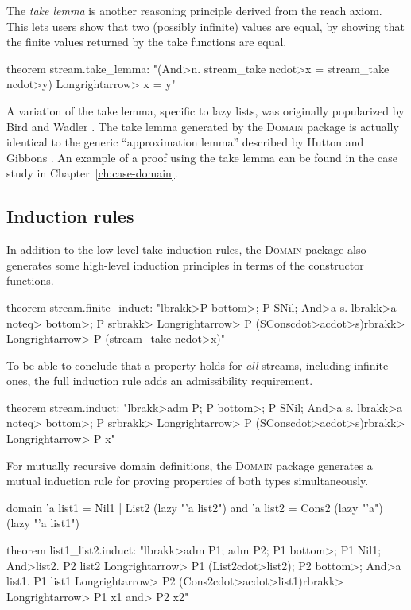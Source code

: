 The \emph{take lemma} is another reasoning principle derived from the reach axiom. This lets users show that two (possibly infinite) values are equal, by showing that the finite values returned by the take functions are equal.
%
\begin{isacode}
theorem stream.take_lemma:
  "(\<And>n. stream_take n\<cdot>x = stream_take n\<cdot>y) \<Longrightarrow> x = y"
\end{isacode}
%
A variation of the take lemma, specific to lazy lists, was originally popularized by Bird and Wadler \cite{BirdWadler1988}. The take lemma generated by the \textsc{Domain} package is actually identical to the generic ``approximation lemma'' described by Hutton and Gibbons \cite{Hutton01}. An example of a proof using the take lemma can be found in the case study in Chapter~\ref{ch:case-domain}.

\subsection{Induction rules}

In addition to the low-level take induction rules, the \textsc{Domain} package also generates some high-level induction principles in terms of the constructor functions.

\begin{isacode}
theorem stream.finite_induct:
  "\<lbrakk>P \<bottom>; P SNil; \<And>a s. \<lbrakk>a \<noteq> \<bottom>; P s\<rbrakk> \<Longrightarrow> P (SCons\<cdot>a\<cdot>s)\<rbrakk>
    \<Longrightarrow> P (stream_take n\<cdot>x)"
\end{isacode}
%
To be able to conclude that a property holds for \emph{all} streams, including infinite ones, the full induction rule adds an admissibility requirement.
%
\begin{isacode}
theorem stream.induct:
  "\<lbrakk>adm P; P \<bottom>; P SNil; \<And>a s. \<lbrakk>a \<noteq> \<bottom>; P s\<rbrakk> \<Longrightarrow> P (SCons\<cdot>a\<cdot>s)\<rbrakk> \<Longrightarrow> P x"
\end{isacode}
%
For mutually recursive domain definitions, the \textsc{Domain} package generates a mutual induction rule for proving properties of both types simultaneously.
%
\begin{isacode}
domain 'a list1 = Nil1 | List2 (lazy "'a list2")
  and 'a list2 = Cons2 (lazy "'a") (lazy "'a list1")
\end{isacode}
\unmedskip
{}
\begin{isacode}
theorem list1_list2.induct:
  "\<lbrakk>adm P1; adm P2; P1 \<bottom>; P1 Nil1; \<And>list2. P2 list2 \<Longrightarrow> P1 (List2\<cdot>list2);
    P2 \<bottom>; \<And>a list1. P1 list1 \<Longrightarrow> P2 (Cons2\<cdot>a\<cdot>list1)\<rbrakk> \<Longrightarrow> P1 x1 \<and> P2 x2"
\end{isacode}

